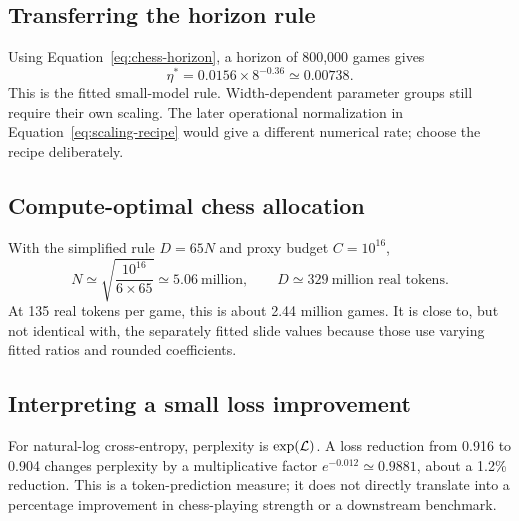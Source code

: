 \subsection{Transferring the horizon rule}
Using Equation~\eqref{eq:chess-horizon}, a horizon of 800,000 games gives
\[
\eta^*=0.0156\times8^{-0.36}\simeq0.00738.
\]
This is the fitted small-model rule. Width-dependent parameter groups still require their own scaling. The later operational normalization in Equation~\eqref{eq:scaling-recipe} would give a different numerical rate; choose the recipe deliberately.

\subsection{Compute-optimal chess allocation}
With the simplified rule $D=65N$ and proxy budget $C=10^{16}$,
\[
N\simeq\sqrt{\frac{10^{16}}{6\times65}}\simeq5.06\ \text{million},
\qquad D\simeq329\ \text{million real tokens}.
\]
At 135 real tokens per game, this is about 2.44 million games. It is close to, but not identical with, the separately fitted slide values because those use varying fitted ratios and rounded coefficients.

\subsection{Interpreting a small loss improvement}
For natural-log cross-entropy, perplexity is $\exp(\mathcal L)$. A loss reduction from 0.916 to 0.904 changes perplexity by a multiplicative factor $e^{-0.012}\simeq0.9881$, about a 1.2\% reduction. This is a token-prediction measure; it does not directly translate into a percentage improvement in chess-playing strength or a downstream benchmark.

